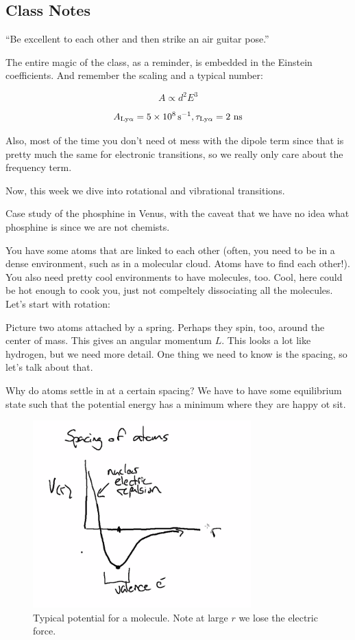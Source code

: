 \documentclass{article}
\newcommand{\unit}[1]{{\,\rm #1}}
\newcommand{\be}{\begin{equation}}
\newcommand{\ee}{\end{equation}}
\newcommand{\s}{\unit{s}}
\begin{document}
\subsection{Class Notes}


``Be excellent to each other and then strike an air guitar pose.''

The entire magic of the class, as a reminder, is embedded in the Einstein coefficients. And remember the scaling and a typical number:

\be
A \propto d^2 E^3 
\ee

\be
A_{\text{Ly}\alpha} = 5 \times 10^{8} \s^{-1}, \tau_{\text{Ly}\alpha} = 2 \text{ ns}
\ee

Also, most of the time you don't need ot mess with the dipole term since that is pretty much the same for electronic transitions, so we really only care about the frequency term. 

Now, this week we dive into rotational and vibrational transitions. 

Case study of the phosphine in Venus, with the caveat that we have no idea what phosphine is since we are not chemists.

You have some atoms that are linked to each other (often, you need to be in a dense environment, such as in a molecular cloud. Atoms have to find each other!). You also need pretty cool environments to have molecules, too. Cool, here could be hot enough to cook you, just not compeltely dissociating all the molecules. Let's start with rotation:

Picture two atoms attached by a spring. Perhaps they spin, too, around the center of mass. This gives an angular momentum $L$. This looks a lot like hydrogen, but we need more detail. One thing we need to know is the spacing, so let's talk about that.

Why do atoms settle in at a certain spacing? We have to have some equilibrium state such that the potential energy has a minimum where they are happy ot sit. 

\begin{figure}
    \centering
    \includegraphics[width=0.75\textwidth]{Screen Shot 2020-09-29 at 11.28.49 AM.png}
    \caption{Typical potential for a molecule. Note at large $r$ we lose the electric force.}
    \label{fig:pot}
\end{figure}
\end{document}
